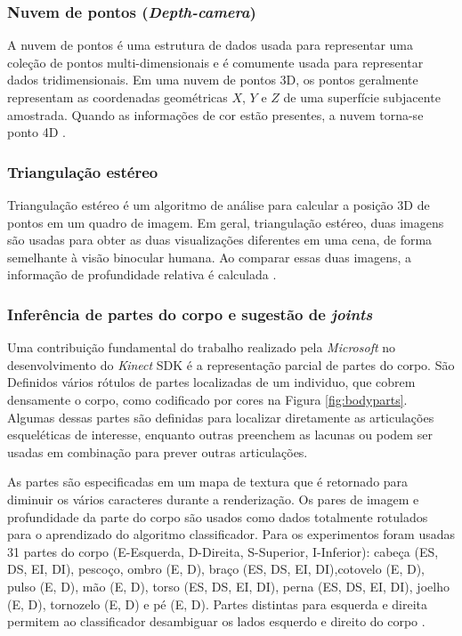 \subsubsection{Nuvem de pontos (\textit{Depth-camera})}\label{sec:nuvem}
A nuvem de pontos é uma estrutura de dados usada para representar uma coleção de pontos multi-dimensionais e é comumente usada para representar dados tridimensionais. Em uma nuvem de pontos 3D, os pontos geralmente representam as coordenadas geométricas $X$, $Y$ e $Z$ de uma superfície subjacente amostrada. Quando as informações de cor estão presentes, a nuvem torna-se ponto 4D \cite{gustavo2014Localizacao}.

\subsubsection{Triangulação estéreo }\label{sec:steroTriang}
Triangulação estéreo é um algoritmo de análise para calcular a posição 3D de pontos em um quadro de imagem. Em geral, triangulação estéreo, duas imagens são usadas para obter as duas visualizações diferentes em uma cena, de forma semelhante à visão binocular humana. Ao comparar essas duas imagens, a informação de profundidade relativa é calculada \cite{kinect4Windows}. 

\subsubsection{Inferência de partes do corpo e sugestão de \textit{joints}}\label{sec:bodyProposal}

Uma contribuição fundamental do trabalho realizado pela \textit{Microsoft} \cite{Shotton:2013:RHP:2398356.2398381} no desenvolvimento do \textit{Kinect} SDK é a representação parcial de partes do corpo. São Definidos vários rótulos de partes localizadas de um individuo, que cobrem densamente o corpo, como codificado por cores na Figura \ref{fig:bodyparts}. Algumas dessas partes são definidas para localizar diretamente as articulações esqueléticas de interesse, enquanto outras preenchem as lacunas ou podem ser usadas em combinação para prever outras articulações.

As partes são especificadas em um mapa de textura que é retornado para diminuir os vários caracteres durante a renderização. Os pares de imagem e profundidade da parte do corpo são usados como dados totalmente rotulados
para o aprendizado do algoritmo classificador. Para os experimentos foram usadas 31 partes do corpo (E-Esquerda, D-Direita, S-Superior, I-Inferior): cabeça (ES, DS, EI, DI), pescoço, ombro (E, D), braço (ES, DS, EI, DI),cotovelo (E, D), pulso (E, D), mão (E, D), torso (ES, DS, EI, DI), perna (ES, DS, EI, DI), joelho (E, D), tornozelo (E, D) e pé (E, D). Partes distintas para esquerda e direita permitem ao classificador desambiguar os lados esquerdo e direito do corpo \cite{Shotton:2013:RHP:2398356.2398381}.

